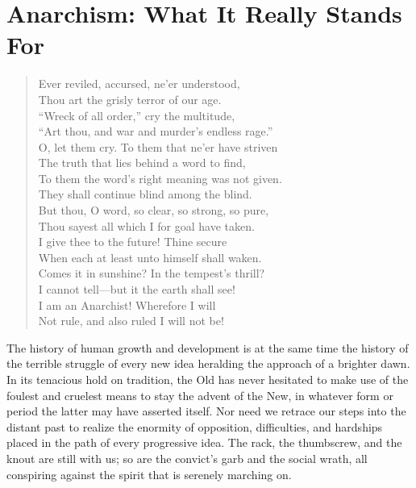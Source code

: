 
\author{Emma Goldman}
\chapter{Anarchism: What It Really Stands For}


\begin{verse}
Ever reviled, accursed, ne'er understood,\\
\vin  Thou art the grisly terror of our age.\\
``Wreck of all order,'' cry the multitude,\\
\vin ``Art thou, and war and murder's endless rage.''\\
O, let them cry. To them that ne'er have striven\\
\vin The truth that lies behind a word to find,\\
To them the word's right meaning was not given.\\
\vin They shall continue blind among the blind.\\
But thou, O word, so clear, so strong, so pure,\\
\vin Thou sayest all which I for goal have taken.\\
I give thee to the future! Thine secure\\
\vin When each at least unto himself shall waken.\\
Comes it in sunshine? In the tempest's thrill?\\
\vin I cannot tell---but it the earth shall see!\\
I am an Anarchist! Wherefore I will\\
\vin Not rule, and also ruled I will not be!
\end{verse}

\noindent The history of human growth and development is at the same
time the history of the terrible struggle of every new idea heralding
the approach of a brighter dawn. In its tenacious hold on tradition,
the Old  has never hesitated to make use of the foulest and
cruelest means to stay the advent of the New, in whatever form or
period the latter may have asserted itself. Nor need we retrace our
steps into the distant past to realize the enormity of opposition,
difficulties, and hardships placed in the path of every progressive
idea. The rack, the thumbscrew, and the knout are still with us; so
are the convict's garb and the social wrath, all conspiring against
the spirit that is serenely marching on.

